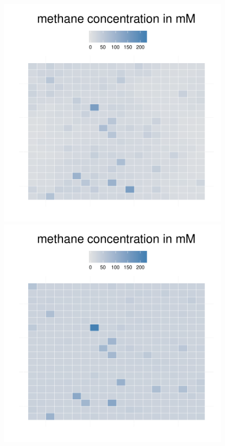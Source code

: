 \begin{figure}[h!]
{\begin{minipage}[t]{0.3\textwidth}
  \end{minipage}
  \begin{minipage}[t]{0.3\textwidth}
    \includegraphics[width=\textwidth]{../results/barkeri_20x20_seed9659_meth75.pdf}
  \end{minipage}
  \begin{minipage}[t]{0.3\textwidth}
    \includegraphics[width=\textwidth]{../results/barkeri_20x20_seed9659_meth100a.pdf}

\end{minipage}}
\end{figure}
